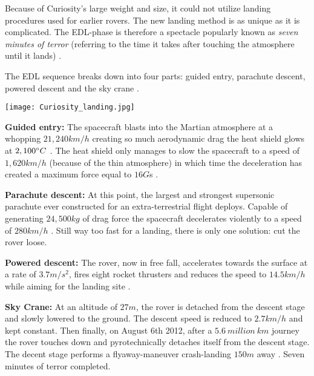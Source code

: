 \begin{tcolorbox}[colback=red!5,colframe=DarkRed!40!black,title=Entry\, Descent and Landing (EDL)]
Because of Curiosity’s large weight and size, it could not utilize landing procedures used for earlier rovers.
The new landing method is as unique as it is complicated.
The EDL-phase is therefore a spectacle popularly known as \textit{seven minutes of terror} (referring to the time it takes after touching the atmosphere until it lands) \cite{CNN_7minterror}. 

The EDL sequence breaks down into four parts: guided entry, parachute descent, powered descent and the sky crane \cite{NASALanding}. \vspace{2mm}

\begin{center}
	\texttt{[image: Curiosity\_landing.jpg]}
\end{center}

\textbf{Guided entry:}
The spacecraft blasts into the Martian atmosphere at a whopping $21,240 km/h$ creating so much aerodynamic drag the heat shield glows at $2,100 \degree C$ \cite{NASA_youtube}.
The heat shield only manages to slow the spacecraft to a speed of $1,620 km/h$ (because of the thin atmosphere) in which time the deceleration has created a maximum force equal to $16 G$s \cite{HistoricLanding} \cite{NASALanding}.

\textbf{Parachute descent:}
At this point, the largest and strongest supersonic parachute ever constructed for an extra-terrestrial flight deploys.
Capable of generating $24,500 kg$ of drag force the spacecraft decelerates violently to a speed of $280 km/h$ \cite{Parachute} \cite{NASALanding}.
Still way too fast for a landing, there is only one solution: cut the rover loose.

\textbf{Powered descent:}
The rover, now in free fall, accelerates towards the surface at a rate of $3.7 m/s^{2}$, fires eight rocket thrusters and reduces the speed to $14.5 km/h$ while aiming for the landing site \cite{HistoricLanding} \cite{NASALanding}. 

\textbf{Sky Crane:}
At an altitude of $27 m$, the rover is detached from the descent stage and slowly lowered to the ground.
The descent speed is reduced to $2.7 km/h$ and kept constant.
Then finally, on August 6th 2012, after a $5.6\ million\ km$ \cite{CNNCuriosity} journey the rover touches down and pyrotechnically detaches itself from the descent stage.
The decent stage performs a flyaway-maneuver crash-landing $150 m$ away \cite{HistoricLanding} \cite{NASALanding}. Seven minutes of terror completed.
\end{tcolorbox}